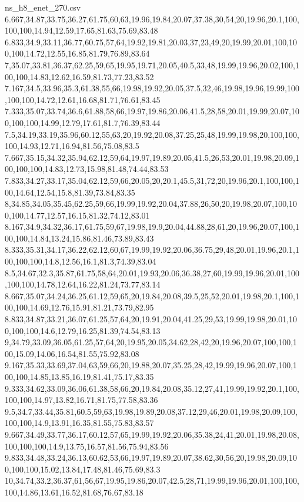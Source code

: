 \begin{filecontents*}[overwrite]{ns_h8_enet_270.csv}
6.667,34.87,33.75,36.27,61.75,60,63,19.96,19.84,20.07,37.38,30,54,20,19.96,20.1,100,100,100,14.94,12.59,17.65,81.63,75.69,83.48
6.833,34.9,33.11,36.77,60.75,57,64,19.92,19.81,20.03,37,23,49,20,19.99,20.01,100,100,100,14.72,12.55,16.85,81.79,76.89,83.64
7,35.07,33.81,36.37,62.25,59,65,19.95,19.71,20.05,40.5,33,48,19.99,19.96,20.02,100,100,100,14.83,12.62,16.59,81.73,77.23,83.52
7.167,34.5,33.96,35.3,61.38,55,66,19.98,19.92,20.05,37.5,32,46,19.98,19.96,19.99,100,100,100,14.72,12.61,16.68,81.71,76.61,83.45
7.333,35.07,33.74,36.6,61.88,58,66,19.97,19.86,20.06,41.5,28,58,20.01,19.99,20.07,100,100,100,14.99,12.79,17.61,81.7,76.39,83.44
7.5,34.19,33.19,35.96,60.12,55,63,20,19.92,20.08,37.25,25,48,19.99,19.98,20,100,100,100,14.93,12.71,16.94,81.56,75.08,83.5
7.667,35.15,34.32,35.94,62.12,59,64,19.97,19.89,20.05,41.5,26,53,20.01,19.98,20.09,100,100,100,14.83,12.73,15.98,81.48,74.44,83.53
7.833,34.27,33.17,35.04,62.12,59,66,20.05,20,20.1,45.5,31,72,20,19.96,20.1,100,100,100,14.64,12.54,15.8,81.39,73.84,83.35
8,34.85,34.05,35.45,62.25,59,66,19.99,19.92,20.04,37.88,26,50,20,19.98,20.07,100,100,100,14.77,12.57,16.15,81.32,74.12,83.01
8.167,34.9,34.32,36.17,61.75,59,67,19.98,19.9,20.04,44.88,28,61,20,19.96,20.07,100,100,100,14.84,13.24,15.86,81.46,73.89,83.43
8.333,35.31,34.17,36.22,62.12,60,67,19.99,19.92,20.06,36.75,29,48,20.01,19.96,20.1,100,100,100,14.8,12.56,16.1,81.3,74.39,83.04
8.5,34.67,32.3,35.87,61.75,58,64,20.01,19.93,20.06,36.38,27,60,19.99,19.96,20.01,100,100,100,14.78,12.64,16.22,81.24,73.77,83.14
8.667,35.07,34.24,36.25,61.12,59,65,20,19.84,20.08,39.5,25,52,20.01,19.98,20.1,100,100,100,14.69,12.76,15.91,81.21,73.79,82.95
8.833,34.87,33.21,36.07,61.25,57,64,20,19.91,20.04,41.25,29,53,19.99,19.98,20.01,100,100,100,14.6,12.79,16.25,81.39,74.54,83.13
9,34.79,33.09,36.05,61.25,57,64,20,19.95,20.05,34.62,28,42,20,19.96,20.07,100,100,100,15.09,14.06,16.54,81.55,75.92,83.08
9.167,35.33,33.69,37.04,63,59,66,20,19.88,20.07,35.25,28,42,19.99,19.96,20.07,100,100,100,14.85,13.85,16.19,81.41,75.17,83.35
9.333,34.62,33.09,36.06,61.38,58,66,20,19.84,20.08,35.12,27,41,19.99,19.92,20.1,100,100,100,14.97,13.82,16.71,81.75,77.58,83.36
9.5,34.7,33.44,35.81,60.5,59,63,19.98,19.89,20.08,37.12,29,46,20.01,19.98,20.09,100,100,100,14.9,13.91,16.35,81.55,75.83,83.57
9.667,34.49,33.77,36.17,60.12,57,65,19.99,19.92,20.06,35.38,24,41,20.01,19.98,20.08,100,100,100,14.9,13.75,16.57,81.56,75.94,83.56
9.833,34.48,33.24,36.13,60.62,53,66,19.97,19.89,20.07,38.62,30,56,20,19.98,20.09,100,100,100,15.02,13.84,17.48,81.46,75.69,83.3
10,34.74,33.2,36.37,61,56,67,19.95,19.86,20.07,42.5,28,71,19.99,19.96,20.01,100,100,100,14.86,13.61,16.52,81.68,76.67,83.18

\end{filecontents*}
